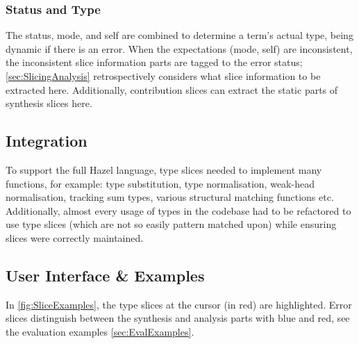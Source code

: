\subsubsection{Status and Type}
The status, mode, and self are combined to determine a term's actual type, being dynamic if there is an error. When the expectations (mode, self) are inconsistent, the inconsistent slice information parts are tagged to the error status; \cref{sec:SlicingAnalysis} retrospectively considers what slice information to be extracted here. Additionally, contribution slices can extract the static parts of synthesis slices here. 

\subsection{Integration}
To support the full Hazel language, type slices needed to implement many functions, for example: type substitution, type normalisation, weak-head normalisation, tracking sum types, various structural matching functions etc. Additionally, almost every usage of types in the codebase had to be refactored to use type slices (which are not so easily pattern matched upon) while ensuring slices were correctly maintained.

\subsection{User Interface \& Examples}
In \cref{fig:SliceExamples}, the type slices at the cursor (in red) are highlighted. Error slices distinguish between the synthesis and analysis parts with blue and red, see the evaluation examples \cref{sec:EvalExamples}.

